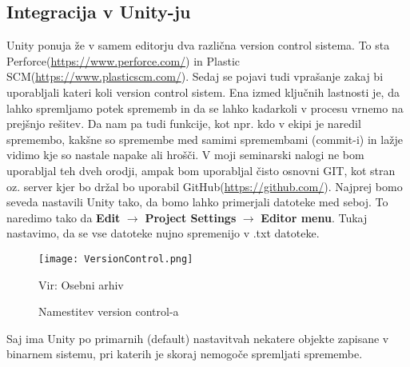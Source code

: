 {\color{indiagreen}\subsection{Integracija v Unity-ju}}
Unity ponuja že v samem editorju dva različna version control sistema. To sta Perforce(\url{https://www.perforce.com/}) in Plastic SCM(\url{https://www.plasticscm.com/}). Sedaj se pojavi tudi vprašanje zakaj bi uporabljali kateri koli version control sistem. Ena izmed ključnih lastnosti je, da lahko spremljamo potek sprememb in da se lahko kadarkoli v procesu vrnemo na prejšnjo rešitev. Da nam pa tudi funkcije, kot npr. kdo v ekipi je naredil spremembo, kakšne so spremembe med samimi spremembami (commit-i) in lažje vidimo kje so nastale napake ali hrošči. 
V moji seminarski nalogi ne bom uporabljal teh dveh orodji, ampak bom uporabljal čisto osnovni GIT, kot stran oz. server kjer bo držal bo uporabil GitHub(\url{https://github.com/}). 
Najprej bomo seveda nastavili Unity tako, da bomo lahko primerjali datoteke med seboj. To naredimo tako da \textbf{Edit} $\rightarrow$ \textbf{Project Settings} $\rightarrow$ \textbf{Editor menu}. Tukaj nastavimo, da se vse datoteke nujno spremenijo v .txt datoteke.\\
\begin{figure}[ht!]
	\centering
	\texttt{[image: VersionControl.png]}
	\caption{Namestitev version control-a}
	{\tiny Vir: Osebni arhiv}
\end{figure}
Saj ima Unity po primarnih (default) nastavitvah nekatere objekte zapisane v binarnem sistemu, pri katerih je skoraj nemogoče spremljati spremembe.